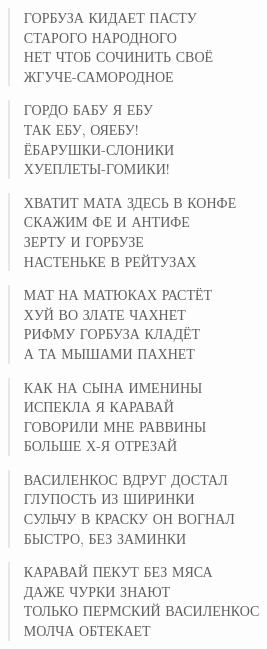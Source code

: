 \poemtitle{***}
\begin{verse}
ГОРБУЗА КИДАЕТ ПАСТУ\\
СТАРОГО НАРОДНОГО\\
НЕТ ЧТОБ СОЧИНИТЬ СВОЁ\\
ЖГУЧЕ-САМОРОДНОЕ
\end{verse}

\poemtitle{***}
\begin{verse}
ГОРДО БАБУ Я ЕБУ\\
ТАК ЕБУ, ОЯЕБУ!\\
ЁБАРУШКИ-СЛОНИКИ\\
ХУЕПЛЕТЫ-ГОМИКИ!
\end{verse}

\poemtitle{***}
\begin{verse}
ХВАТИТ МАТА ЗДЕСЬ В КОНФЕ\\
СКАЖИМ ФЕ И АНТИФЕ\\
ЗЕРТУ И ГОРБУЗЕ\\
НАСТЕНЬКЕ В РЕЙТУЗАХ
\end{verse}

\poemtitle{***}
\begin{verse}
МАТ НА МАТЮКАХ РАСТЁТ\\
ХУЙ ВО ЗЛАТЕ ЧАХНЕТ\\
РИФМУ ГОРБУЗА КЛАДЁТ\\
А ТА МЫШАМИ ПАХНЕТ
\end{verse}

\poemtitle{***}
\begin{verse}
КАК НА СЫНА ИМЕНИНЫ\\
ИСПЕКЛА Я КАРАВАЙ\\
ГОВОРИЛИ МНЕ РАВВИНЫ\\
БОЛЬШЕ Х-Я ОТРЕЗАЙ
\end{verse}

\poemtitle{***}
\begin{verse}
ВАСИЛЕНКОС ВДРУГ ДОСТАЛ\\
ГЛУПОСТЬ ИЗ ШИРИНКИ\\
СУЛЬЧУ В КРАСКУ ОН ВОГНАЛ\\
БЫСТРО, БЕЗ ЗАМИНКИ
\end{verse}

\poemtitle{***}
\begin{verse}
КАРАВАЙ ПЕКУТ БЕЗ МЯСА\\
ДАЖЕ ЧУРКИ ЗНАЮТ\\
ТОЛЬКО ПЕРМСКИЙ ВАСИЛЕНКОС\\
МОЛЧА ОБТЕКАЕТ
\end{verse}

